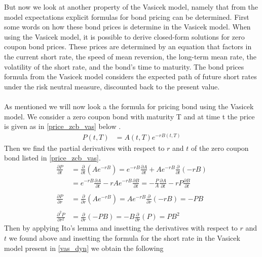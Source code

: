 But now we look at another property of the Vasicek model, namely that from the model expectations  explicit 
formulas for bond pricing can be determined. First some words on how these bond prices is determine in the Vasicek model. 
When using the Vasicek model, it is possible to derive closed-form solutions for zero coupon bond prices. 
These prices are determined by an equation that factors in the current short rate, the speed of mean reversion,
the long-term mean rate, the volatility of the short rate, and the bond’s time to maturity.
The bond prices formula from the Vasicek model considers the expected path of future short 
rates under the risk neutral measure, discounted back to the present value. 
\\\\
As mentioned we will now look a the formula for pricing bond using the Vasicek model. We consider a zero coupon bond
with maturity T and at time t the price is given as in \autoref{price_zcb_vas} below \cite{Bjork}.
\begin{align}
    P(t,T) &= A(t,T) e^{-rB(t,T)} 
    \label{price_zcb_vas} 
\end{align}
Then we find the partial derivatives with respect to $r$ and $t$ of the zero coupon bond listed in \autoref{price_zcb_vas}.
\begin{align*}
    \frac{\partial P}{\partial t} &= \frac{\partial}{\partial t} (Ae^{-rB}) 
    = e^{-rB} \frac{\partial A}{\partial t} + Ae^{-rB} \frac{\partial}{\partial t} (-rB) \\
    &= e^{-rB} \frac{\partial A}{\partial t} - rAe^{-rB} \frac{\partial B}{\partial t} = 
    - \frac{P}{A} \frac{\partial A}{\partial t} - rP \frac{\partial B}{\partial t}
    \\\\
    \frac{\partial P}{\partial r} &= \frac{\partial}{\partial r} (Ae^{-rB}) 
    = Ae^{-rB} \frac{\partial}{\partial r} (-rB) = -PB 
    \\\\
    \frac{\partial^2 P}{\partial r^2} &= \frac{\partial}{\partial r} (-PB) = -B \frac{\partial}{\partial r} (P) = PB^2
\end{align*}
Then by applying Ito's lemma \cite{Bjork} and insetting the derivatives with respect to $r$ and $t$ we found above and
insetting the formula for the short rate in the Vasicek model present in \autoref{vas_dyn} we obtain the following
